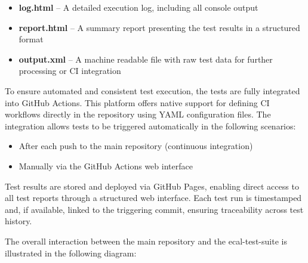 \begin{itemize}
	\item \textbf{log.html} – A detailed execution log, including all console output
	\item \textbf{report.html} – A summary report presenting the test results in a structured format
	\item \textbf{output.xml} – A machine readable file with raw test data for further processing or CI integration
\end{itemize}

\vspace{0.9em}
To ensure automated and consistent test execution, the tests are fully integrated into GitHub Actions. This platform offers native support for defining CI workflows directly in the repository using YAML configuration files. The integration allows tests to be triggered automatically in the following scenarios:

\begin{itemize}
	\item After each push to the main repository (continuous integration)
	\item Manually via the GitHub Actions web interface
\end{itemize}

\vspace{0.5em}
Test results are stored and deployed via GitHub Pages, enabling direct access to all test reports through a structured web interface. Each test run is timestamped and, if available, linked to the triggering commit, ensuring traceability across test history.

\vspace{0.5em}
The overall interaction between the main repository and the ecal-test-suite is illustrated in the following diagram:

